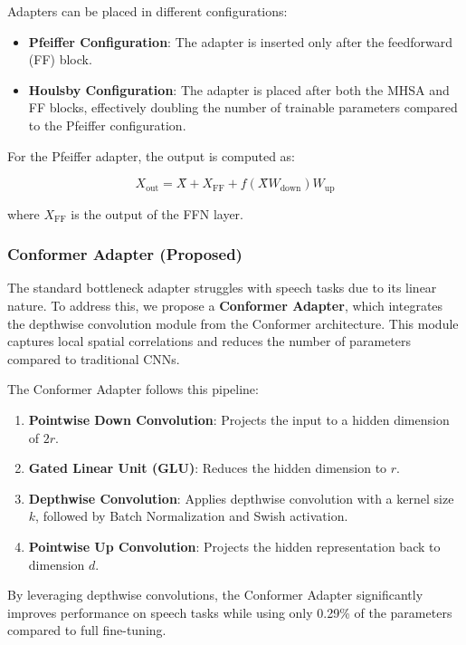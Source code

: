 \documentclass[11pt]{article}
\begin{document}
Adapters can be placed in different configurations:
\begin{itemize}
    \item \textbf{Pfeiffer Configuration}: The adapter is inserted only after the feedforward (FF) block.
    \item \textbf{Houlsby Configuration}: The adapter is placed after both the MHSA and FF blocks, effectively doubling the number of trainable parameters compared to the Pfeiffer configuration.
\end{itemize}

For the Pfeiffer adapter, the output is computed as:

\begin{equation}
X_{\text{out}} = X̂ + X_{\text{FF}} + f(X̂ W_{\text{down}}) W_{\text{up}}
\end{equation}

where $X_{\text{FF}}$ is the output of the FFN layer.

\subsubsection{Conformer Adapter (Proposed)}
The standard bottleneck adapter struggles with speech tasks due to its linear nature. To address this, we propose a \textbf{Conformer Adapter}, which integrates the depthwise convolution module from the Conformer architecture. This module captures local spatial correlations and reduces the number of parameters compared to traditional CNNs.

The Conformer Adapter follows this pipeline:
\begin{enumerate}
    \item \textbf{Pointwise Down Convolution}: Projects the input to a hidden dimension of $2r$.
    \item \textbf{Gated Linear Unit (GLU)}: Reduces the hidden dimension to $r$.
    \item \textbf{Depthwise Convolution}: Applies depthwise convolution with a kernel size $k$, followed by Batch Normalization and Swish activation.
    \item \textbf{Pointwise Up Convolution}: Projects the hidden representation back to dimension $d$.
\end{enumerate}

By leveraging depthwise convolutions, the Conformer Adapter significantly improves performance on speech tasks while using only 0.29\% of the parameters compared to full fine-tuning.
\end{document}
